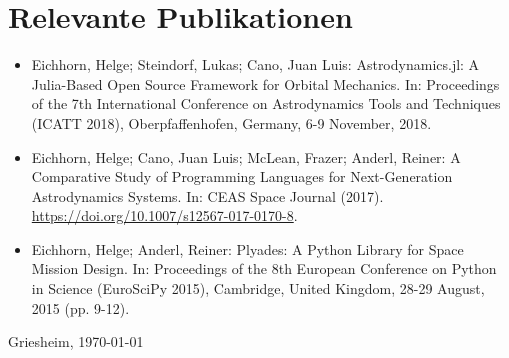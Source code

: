 \documentclass[10pt,a4paper]{moderncv}
\begin{document}
\section{Relevante Publikationen}
\begin{itemize}
    \item Eichhorn, Helge; Steindorf, Lukas; Cano, Juan Luis: Astrodynamics.jl: A Julia-Based Open Source Framework for Orbital Mechanics. In: Proceedings of the 7th International Conference on Astrodynamics Tools and Techniques (ICATT 2018), Oberpfaffenhofen, Germany, 6-9 November, 2018.
    \item Eichhorn, Helge; Cano, Juan Luis; McLean, Frazer; Anderl, Reiner: A Comparative Study of Programming Languages for Next-Generation Astrodynamics Systems. In: CEAS Space Journal (2017). \url{https://doi.org/10.1007/s12567-017-0170-8}.
    \item Eichhorn, Helge; Anderl, Reiner: Plyades: A Python Library for Space Mission Design. In: Proceedings of the 8th European Conference on Python in Science (EuroSciPy 2015), Cambridge, United Kingdom, 28-29 August, 2015 (pp. 9-12).
\end{itemize}
\bigskip
\bigskip
\bigskip
\bigskip
\bigskip
Griesheim, \today %
\end{document}
